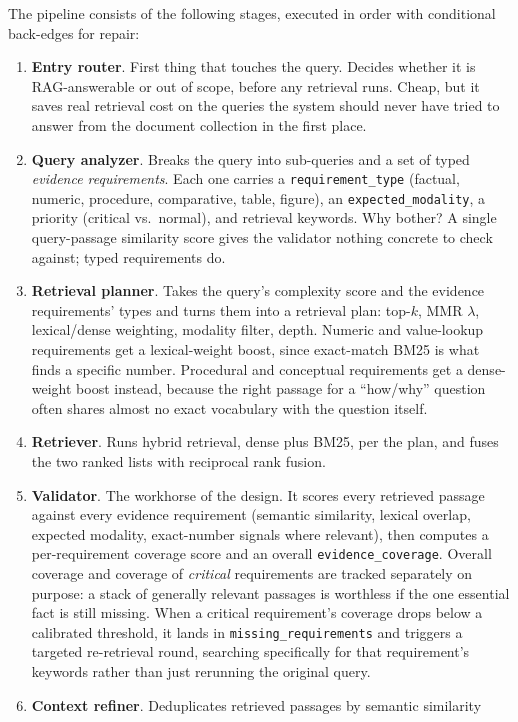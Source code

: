 \documentclass[conference]{IEEEtran}
\begin{document}
The pipeline consists of the following stages, executed in order with conditional
back-edges for repair:

\begin{enumerate}
\item \textbf{Entry router}. First thing that touches the query. Decides whether it is
RAG-answerable or out of scope, before any retrieval runs. Cheap, but it saves real
retrieval cost on the queries the system should never have tried to answer from the
document collection in the first place.
\item \textbf{Query analyzer}. Breaks the query into sub-queries and a set of typed
\emph{evidence requirements}. Each one carries a \texttt{requirement\_type} (factual,
numeric, procedure, comparative, table, figure), an \texttt{expected\_modality}, a
priority (critical vs.\ normal), and retrieval keywords. Why bother? A single
query-passage similarity score gives the validator nothing concrete to check against;
typed requirements do.
\item \textbf{Retrieval planner}. Takes the query's complexity score and the evidence
requirements' types and turns them into a retrieval plan: top-$k$, MMR $\lambda$,
lexical/dense weighting, modality filter, depth. Numeric and value-lookup requirements
get a lexical-weight boost, since exact-match BM25 is what finds a specific number.
Procedural and conceptual requirements get a dense-weight boost instead, because the
right passage for a ``how/why'' question often shares almost no exact vocabulary with
the question itself.
\item \textbf{Retriever}. Runs hybrid retrieval, dense plus BM25, per the plan, and
fuses the two ranked lists with reciprocal rank fusion.
\item \textbf{Validator}. The workhorse of the design. It scores every retrieved
passage against every evidence requirement (semantic similarity, lexical overlap,
expected modality, exact-number signals where relevant), then computes a
per-requirement coverage score and an overall \texttt{evidence\_coverage}. Overall
coverage and coverage of \emph{critical} requirements are tracked separately on
purpose: a stack of generally relevant passages is worthless if the one essential fact
is still missing. When a critical requirement's coverage drops below a calibrated
threshold, it lands in \texttt{missing\_requirements} and triggers a targeted
re-retrieval round, searching specifically for that requirement's keywords rather than
just rerunning the original query.
\item \textbf{Context refiner}. Deduplicates retrieved passages by semantic similarity

\end{enumerate}
\end{document}
